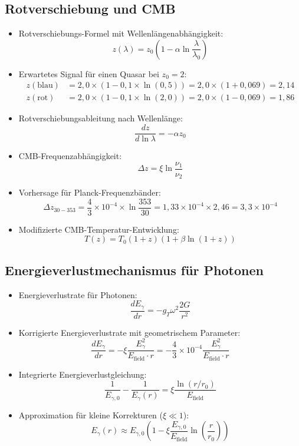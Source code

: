 \documentclass[12pt,a4paper]{article}
\begin{document}
	\subsection{Rotverschiebung und CMB}
	\begin{itemize}
		\item Rotverschiebungs-Formel mit Wellenl\"{a}ngenabh\"{a}ngigkeit:
		$$z(\lambda) = z_0\left(1 - \alpha \ln\frac{\lambda}{\lambda_0}\right)$$
		
		\item Erwartetes Signal f\"{u}r einen Quasar bei $z_0 = 2$:
		\begin{align*}
			z(\text{blau}) &= 2,0 \times (1 - 0,1 \times \ln(0,5)) = 2,0 \times (1 + 0,069) = 2,14\\
			z(\text{rot}) &= 2,0 \times (1 - 0,1 \times \ln(2,0)) = 2,0 \times (1 - 0,069) = 1,86
		\end{align*}
		
		\item Rotverschiebungsableitung nach Wellenl\"{a}nge:
		$$\frac{dz}{d\ln\lambda} = -\alpha z_0$$
		
		\item CMB-Frequenzabh\"{a}ngigkeit:
		$$\Delta z = \xi \ln\frac{\nu_1}{\nu_2}$$
		
		\item Vorhersage f\"{u}r Planck-Frequenzb\"{a}nder:
		$$\Delta z_{30-353} = \frac{4}{3} \times 10^{-4} \times \ln\frac{353}{30} = 1,33 \times 10^{-4} \times 2,46 = 3,3 \times 10^{-4}$$
		
		\item Modifizierte CMB-Temperatur-Entwicklung:
		$$\boxed{T(z) = T_0(1+z)\left(1 + \beta \ln(1+z)\right)}$$
	\end{itemize}
	
	\subsection{Energieverlustmechanismus f\"{u}r Photonen}
	\begin{itemize}
		\item Energieverlustrate f\"{u}r Photonen:
		$$\frac{dE_\gamma}{dr} = -g_T \omega^2 \frac{2G}{r^2}$$
		
		\item Korrigierte Energieverlustrate mit geometrischem Parameter:
		$$\boxed{\frac{dE_\gamma}{dr} = -\xi \frac{E_\gamma^2}{E_{\text{field}} \cdot r} = -\frac{4}{3} \times 10^{-4} \frac{E_\gamma^2}{E_{\text{field}} \cdot r}}$$
		
		\item Integrierte Energieverlustgleichung:
		$$\frac{1}{E_{\gamma,0}} - \frac{1}{E_\gamma(r)} = \xi \frac{\ln(r/r_0)}{E_{\text{field}}}$$
		
		\item Approximation f\"{u}r kleine Korrekturen ($\xi \ll 1$):
		$$E_\gamma(r) \approx E_{\gamma,0} \left(1 - \xi \frac{E_{\gamma,0}}{E_{\text{field}}} \ln\left(\frac{r}{r_0}\right)\right)$$
	\end{itemize}
	
\end{document}
